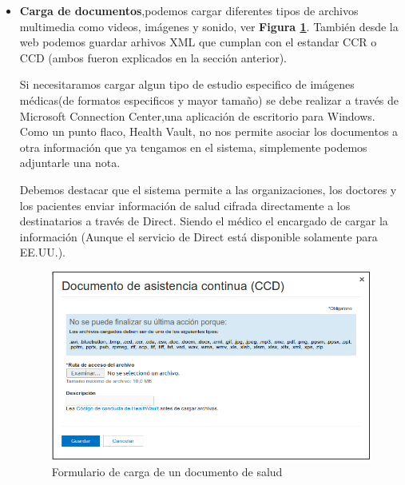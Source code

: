 \begin{itemize}
\item \textbf{Carga de documentos},podemos cargar diferentes tipos de archivos multimedia como videos, imágenes y sonido, ver \textbf{Figura \ref{carga_documento}}. 
También desde la web podemos guardar arhivos XML que cumplan con el estandar CCR o CCD (ambos fueron explicados en la sección anterior).

Si necesitaramos cargar algun tipo de estudio especifico de imágenes médicas(de formatos especificos y mayor tamaño) se debe realizar a través de Microsoft Connection Center,una aplicación de escritorio para Windows. Como un punto flaco, Health Vault, no nos permite asociar los documentos a otra información que ya tengamos en el sistema, simplemente podemos adjuntarle una nota.

	Debemos destacar que el sistema permite a las organizaciones, los doctores y los pacientes enviar información de salud cifrada directamente a los destinatarios a través de Direct. 
    Siendo el médico el encargado de cargar la información (Aunque el servicio de Direct está disponible solamente para EE.UU.).%

    \begin{figure}[h]
      \centering
      \includegraphics[width=.8\textwidth]{img/tp1/3-carga_documento}
      \caption{Formulario de carga de un documento de salud}
      \label{carga_documento}
    \end{figure} 


\end{itemize}
